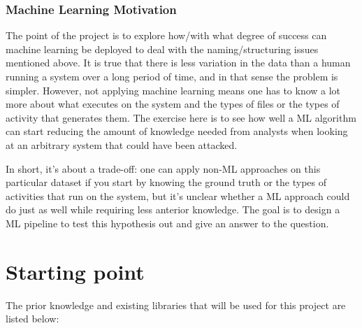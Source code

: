 \subsubsection*{Machine Learning Motivation}

The point of the project is to explore how/with what degree of success can machine learning be deployed to deal with the naming/structuring issues mentioned above. It is true that there is less variation in the data than a human running a system over a long period of time, and in that sense the problem is simpler. However, not applying machine learning means one has to know a lot more about what executes on the system and the types of files or the types of activity that generates them. The exercise here is to see how well a ML algorithm can start reducing the amount of knowledge needed from analysts when looking at an arbitrary system that could have been attacked.

In short, it's about a trade-off: one can apply non-ML approaches on this particular dataset if you start by knowing the ground truth or the types of activities that run on the system, but it's unclear whether a ML approach could do just as well while requiring less anterior knowledge. The goal is to design a ML pipeline to test this hypothesis out and give an answer to the question. \\

\section*{Starting point}

The prior knowledge and existing libraries that will be used for this project are listed below: \\

